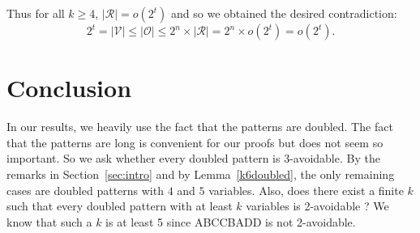 \documentclass[]{elsart}
\begin{document}
Thus for all $k\ge 4$, $|\mathcal{R}| = o(2^t)$ and so we obtained the
desired contradiction: $$2^t=|\mathcal{V}|\le |\mathscr{O}| \le 2^n\times|\mathcal{R}|= 2^n
\times o(2^t)=o(2^t).$$

\section{Conclusion}

In our results, we heavily use the fact that the patterns are doubled.
The fact that the patterns are long is convenient for our proofs but
does not seem so important. So we ask whether every doubled pattern
is 3-avoidable. By the remarks in Section~\ref{sec:intro} and by
Lemma~\ref{k6doubled}, the only remaining cases are doubled patterns
with $4$ and $5$ variables. Also, does there exist a finite $k$
such that every doubled pattern with at least $k$ variables is
2-avoidable ?  We know that such a $k$ is at least 5 since ABCCBADD is
not 2-avoidable.
\end{document}
